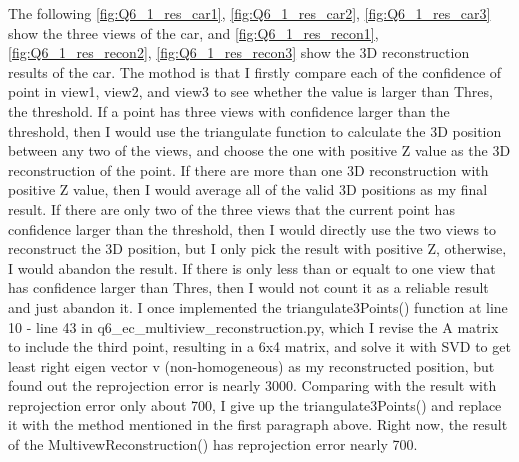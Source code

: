 
\begin{your_solution}[title=Q6.1,height=21.5cm,width=\linewidth]
The following \autoref{fig:Q6_1_res_car1}, \autoref{fig:Q6_1_res_car2}, \autoref{fig:Q6_1_res_car3} show the three views of the car, and \autoref{fig:Q6_1_res_recon1}, \autoref{fig:Q6_1_res_recon2}, \autoref{fig:Q6_1_res_recon3} show the 3D reconstruction results of the car. The mothod is that I firstly compare each of the confidence of point in view1, view2, and view3 to see whether the value is larger than Thres, the threshold. If a point has three views with confidence larger than the threshold, then I would use the triangulate function to calculate the 3D position between any two of the views, and choose the one with positive Z value as the 3D reconstruction of the point. If there are more than one 3D reconstruction with positive Z value, then I would average all of the valid 3D positions as my final result. If there are only two of the three views that the current point has confidence larger than the threshold, then I would directly use the two views to reconstruct the 3D position, but I only pick the result with positive Z, otherwise, I would abandon the result. If there is only less than or equalt to one view that has confidence larger than Thres, then I would not count it as a reliable result and just abandon it. \newline
I once implemented the triangulate3Points() function at line 10 - line 43 in q6\_ec\_multiview\_reconstruction.py, which I revise the A matrix to include the third point, resulting in a 6x4 matrix, and solve it with SVD to get least right eigen vector v (non-homogeneous) as my reconstructed position, but found out the reprojection error is nearly 3000. Comparing with the result with reprojection error only about 700, I give up the triangulate3Points() and replace it with the method mentioned in the first paragraph above. Right now, the result of the MultivewReconstruction() has reprojection error nearly 700.
\newline


\end{your_solution}
